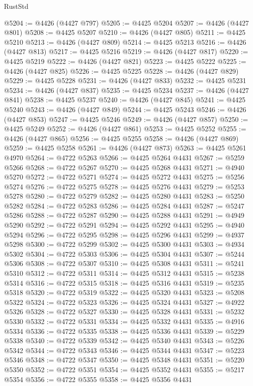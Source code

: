 \begin{lexlean}{RustStd}
\begin{coremodule}
@5204 := @4426 (@4427 @797)
@5205 := @4425 @5204
@5207 := @4426 (@4427 @801)
@5208 := @4425 @5207
@5210 := @4426 (@4427 @805)
@5211 := @4425 @5210
@5213 := @4426 (@4427 @809)
@5214 := @4425 @5213
@5216 := @4426 (@4427 @813)
@5217 := @4425 @5216
@5219 := @4426 (@4427 @817)
@5220 := @4425 @5219
@5222 := @4426 (@4427 @821)
@5223 := @4425 @5222
@5225 := @4426 (@4427 @825)
@5226 := @4425 @5225
@5228 := @4426 (@4427 @829)
@5229 := @4425 @5228
@5231 := @4426 (@4427 @833)
@5232 := @4425 @5231
@5234 := @4426 (@4427 @837)
@5235 := @4425 @5234
@5237 := @4426 (@4427 @841)
@5238 := @4425 @5237
@5240 := @4426 (@4427 @845)
@5241 := @4425 @5240
@5243 := @4426 (@4427 @849)
@5244 := @4425 @5243
@5246 := @4426 (@4427 @853)
@5247 := @4425 @5246
@5249 := @4426 (@4427 @857)
@5250 := @4425 @5249
@5252 := @4426 (@4427 @861)
@5253 := @4425 @5252
@5255 := @4426 (@4427 @865)
@5256 := @4425 @5255
@5258 := @4426 (@4427 @869)
@5259 := @4425 @5258
@5261 := @4426 (@4427 @873)
@5263 := @4425 @5261 @4970
@5264 := @4722 @5263
@5266 := @4425 @5264 @4431
@5267 := @5259 @5266
@5268 := @4722 @5267
@5270 := @4425 @5268 @4431
@5271 := @4940 @5270
@5272 := @4722 @5271
@5274 := @4425 @5272 @4431
@5275 := @5256 @5274
@5276 := @4722 @5275
@5278 := @4425 @5276 @4431
@5279 := @5253 @5278
@5280 := @4722 @5279
@5282 := @4425 @5280 @4431
@5283 := @5250 @5282
@5284 := @4722 @5283
@5286 := @4425 @5284 @4431
@5287 := @5247 @5286
@5288 := @4722 @5287
@5290 := @4425 @5288 @4431
@5291 := @4949 @5290
@5292 := @4722 @5291
@5294 := @4425 @5292 @4431
@5295 := @4940 @5294
@5296 := @4722 @5295
@5298 := @4425 @5296 @4431
@5299 := @4937 @5298
@5300 := @4722 @5299
@5302 := @4425 @5300 @4431
@5303 := @4934 @5302
@5304 := @4722 @5303
@5306 := @4425 @5304 @4431
@5307 := @5244 @5306
@5308 := @4722 @5307
@5310 := @4425 @5308 @4431
@5311 := @5241 @5310
@5312 := @4722 @5311
@5314 := @4425 @5312 @4431
@5315 := @5238 @5314
@5316 := @4722 @5315
@5318 := @4425 @5316 @4431
@5319 := @5235 @5318
@5320 := @4722 @5319
@5322 := @4425 @5320 @4431
@5323 := @5208 @5322
@5324 := @4722 @5323
@5326 := @4425 @5324 @4431
@5327 := @4922 @5326
@5328 := @4722 @5327
@5330 := @4425 @5328 @4431
@5331 := @5232 @5330
@5332 := @4722 @5331
@5334 := @4425 @5332 @4431
@5335 := @4916 @5334
@5336 := @4722 @5335
@5338 := @4425 @5336 @4431
@5339 := @5229 @5338
@5340 := @4722 @5339
@5342 := @4425 @5340 @4431
@5343 := @5226 @5342
@5344 := @4722 @5343
@5346 := @4425 @5344 @4431
@5347 := @5223 @5346
@5348 := @4722 @5347
@5350 := @4425 @5348 @4431
@5351 := @5220 @5350
@5352 := @4722 @5351
@5354 := @4425 @5352 @4431
@5355 := @5217 @5354
@5356 := @4722 @5355
@5358 := @4425 @5356 @4431

\end{coremodule}
\end{lexlean}
